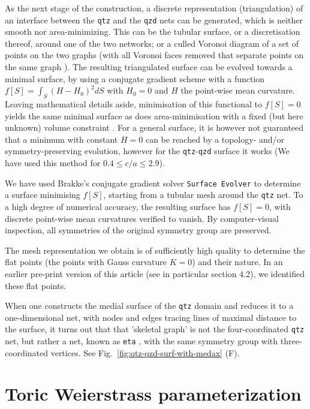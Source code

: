 \documentclass[a4paper]{amsart}
\theoremstyle{plain}
\theoremstyle{definition}
\begin{document}
As the next stage of the construction, a discrete representation
(triangulation) of an interface between the {\texttt{qtz}} and the
{\texttt{qzd}} nets can be generated, which is neither smooth nor
area-minimizing. This can be the tubular surface, or a discretisation thereof,
around one of the two networks; or a culled Voronoi diagram of a set of points
on the two graphs (with all Voronoi faces removed that separate points on the
same graph \cite{de_Campo_2013,Himmelmann2025}).  The resulting triangulated
surface can be evolved towards a minimal surface, by using a conjugate gradient
scheme with a function $f[S]=\int_S (H-H_0)^2 dS$ with $H_0=0$ and $H$ the
point-wise mean curvature. Leaving mathematical details aside, minimisation of
this functional to $f[S]=0$ yields the same minimal surface as does
area-minimisation with a fixed (but here unknown) volume constraint
\cite{KGB_1997}. For a general surface, it is however not guaranteed that a
minimum with constant $H=0$ can be reached by a topology- and/or
symmetry-preserving evolution, however for the \texttt{qtz}-\texttt{qzd}
surface it works (We have used this method for $0.4\le c/a\le 2.9$). 

We have used Brakke's conjugate gradient solver {\tt Surface Evolver}
\cite{Brakke_1992} to determine a surface minimising $f[S]$, starting from a
tubular mesh around the {\texttt{qtz}} net. To a high degree of numerical
accuracy, the resulting surface has $f[S]=0$, with discrete point-wise mean
curvatures verified to vanish. By computer-visual inspection, all symmetries of
the original symmetry group are preserved.

The mesh representation we obtain is of sufficiently high quality to determine
the flat points (the points with Gauss curvature $K=0$) and their nature. In an
earlier pre-print version of this article \cite{preprint} (see in particular
section 4.2), we identified these flat points.

When one constructs the medial surface of the \texttt{qtz} domain and reduces
it to a one-dimensional net, with nodes and edges tracing lines of maximal
distance to the surface, it turns out that that 'skeletal graph' is not the
four-coordinated \texttt{qtz} net, but rather a net, known as \texttt{eta}
\cite{Rosi_2005}, with the same symmetry group with three-coordinated vertices.
See Fig.\ \ref{fig:qtz-qzd-surf-with-medax} (F). 


\section{Toric Weierstrass parameterization}\label{sec:Weierstrass-construction-hao}
\end{document}
